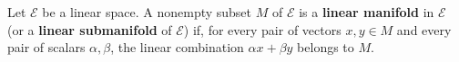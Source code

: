 Let $\mathcal{E}$ be a linear space. A nonempty subset $M$ of $\mathcal{E}$ is a \textbf{linear manifold} in $\mathcal{E}$ (or a \textbf{linear submanifold} of $\mathcal{E}$) if, for every pair of vectors $x, y \in M$ and every pair of scalars $\alpha, \beta$, the linear combination $\alpha x + \beta y$ belongs to $M$.
